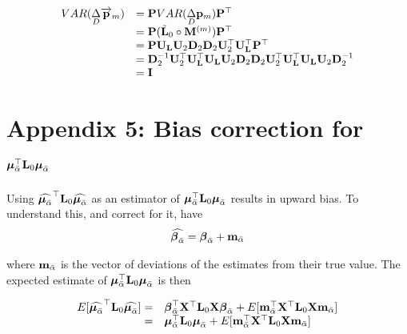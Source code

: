\documentclass[12pt]{article}
\begin{document}
\begin{bibunit}
\begin{equation} 
\begin{array}{rl}
VAR(\underset{D}\Delta \overrightarrow{\bf p}_m) &= {\bf P}VAR(\underset{D}\Delta {\bf p}_m){\bf P}^{\top}\\
&= {\bf P}(\tilde{\bf L}_{0}\circ{\bf M}^{(m)}){\bf P}^{\top}\\
&= {\bf P}{\bf U}_{\bf L}{\bf U}_2{\bf D}_2{\bf D}_2{\bf U}_2^{\top}{\bf U}_{\bf L}^{\top}{\bf P}^{\top}\\
&= {\bf D}_2^{-1}{\bf U}_2^{\top}{\bf U}_{\bf L}^{\top}{\bf U}_{\bf L}{\bf U}_2{\bf D}_2{\bf D}_2{\bf U}_2^{\top}{\bf U}_{\bf L}^{\top}{\bf U}_{\bf L}{\bf U}_2{\bf D}_2^{-1}\\
&= {\bf I}\\
\end{array}
\end{equation}

\section{Appendix 5: Bias correction for $\boldsymbol{\mu}_{\bar{\alpha}}^{\top}{\bf L}_0\boldsymbol{\mu}_{\bar{\alpha}}$}
\label{App:bias_correction}

Using $\widehat{\boldsymbol{\mu}_{\bar{\alpha}}}^{\top}{\bf L}_0\widehat{\boldsymbol{\mu}_{\bar{\alpha}}}$ as an estimator of $\boldsymbol{\mu}_{\bar{\alpha}}^{\top}{\bf L}_0\boldsymbol{\mu}_{\bar{\alpha}}$ results in upward bias. To understand this, and correct for it, have
\begin{equation} 
\widehat{{\boldsymbol \beta}_{\bar{\alpha}}} = {\boldsymbol \beta}_{\bar{\alpha}}+{\bf m}_{\bar{\alpha}}
\end{equation}

where  ${\bf m}_{\bar{\alpha}}$ is the vector of deviations of the estimates from their true value.  The expected estimate of $\boldsymbol{\mu}_{\bar{\alpha}}^{\top}{\bf L}_0\boldsymbol{\mu}_{\bar{\alpha}}$ is then

\begin{equation}
\begin{array}{rl}
E[\widehat{\boldsymbol{\mu}_{\bar{\alpha}}}^{\top}{\bf L}_0\widehat{\boldsymbol{\mu}_{\bar{\alpha}}}]=& {\boldsymbol \beta}_{\bar{\alpha}}^{\top}{\bf X}^{\top}{\bf L}_0{\bf X}{\boldsymbol \beta}_{\bar{\alpha}}+E[{\bf m}_{\bar{\alpha}}^{\top}{\bf X}^{\top}{\bf L}_0{\bf X}{\bf m}_{\bar{\alpha}}]\\
=& \boldsymbol{\mu}_{\bar{\alpha}}^{\top}{\bf L}_0\boldsymbol{\mu}_{\bar{\alpha}}+E[{\bf m}_{\bar{\alpha}}^{\top}{\bf X}^{\top}{\bf L}_0{\bf X}{\bf m}_{\bar{\alpha}}]\\


\end{array}
\end{equation}
\end{bibunit}
\end{document}
